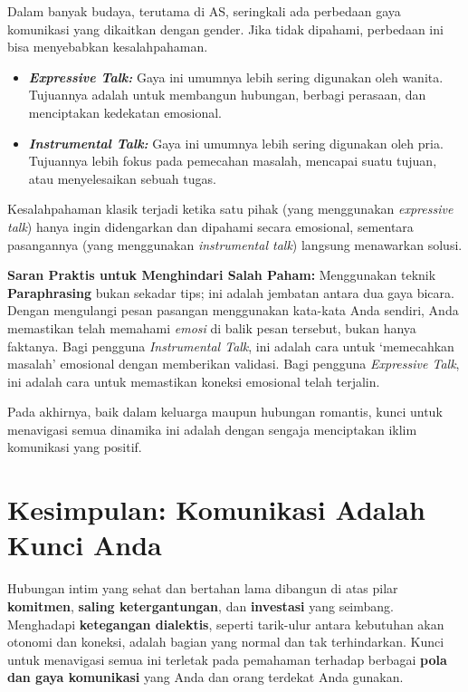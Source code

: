 \documentclass[
  letterpaper,
  DIV=11,
  numbers=noendperiod]{scrreprt}
\providecommand{\tightlist}{%
  \setlength{\itemsep}{0pt}\setlength{\parskip}{0pt}}
\begin{document}
Dalam banyak budaya, terutama di AS, seringkali ada perbedaan gaya
komunikasi yang dikaitkan dengan gender. Jika tidak dipahami, perbedaan
ini bisa menyebabkan kesalahpahaman.

\begin{itemize}
\tightlist
\item
  \emph{\textbf{Expressive Talk:}} Gaya ini umumnya lebih sering
  digunakan oleh wanita. Tujuannya adalah untuk membangun hubungan,
  berbagi perasaan, dan menciptakan kedekatan emosional.
\item
  \emph{\textbf{Instrumental Talk:}} Gaya ini umumnya lebih sering
  digunakan oleh pria. Tujuannya lebih fokus pada pemecahan masalah,
  mencapai suatu tujuan, atau menyelesaikan sebuah tugas.
\end{itemize}

Kesalahpahaman klasik terjadi ketika satu pihak (yang menggunakan
\emph{expressive talk}) hanya ingin didengarkan dan dipahami secara
emosional, sementara pasangannya (yang menggunakan \emph{instrumental
talk}) langsung menawarkan solusi.

\textbf{Saran Praktis untuk Menghindari Salah Paham:} Menggunakan teknik
\textbf{Paraphrasing} bukan sekadar tips; ini adalah jembatan antara dua
gaya bicara. Dengan mengulangi pesan pasangan menggunakan kata-kata Anda
sendiri, Anda memastikan telah memahami \emph{emosi} di balik pesan
tersebut, bukan hanya faktanya. Bagi pengguna \emph{Instrumental Talk},
ini adalah cara untuk `memecahkan masalah' emosional dengan memberikan
validasi. Bagi pengguna \emph{Expressive Talk}, ini adalah cara untuk
memastikan koneksi emosional telah terjalin.

Pada akhirnya, baik dalam keluarga maupun hubungan romantis, kunci untuk
menavigasi semua dinamika ini adalah dengan sengaja menciptakan iklim
komunikasi yang positif.

\section{Kesimpulan: Komunikasi Adalah Kunci
Anda}\label{kesimpulan-komunikasi-adalah-kunci-anda}

Hubungan intim yang sehat dan bertahan lama dibangun di atas pilar
\textbf{komitmen}, \textbf{saling ketergantungan}, dan
\textbf{investasi} yang seimbang. Menghadapi \textbf{ketegangan
dialektis}, seperti tarik-ulur antara kebutuhan akan otonomi dan
koneksi, adalah bagian yang normal dan tak terhindarkan. Kunci untuk
menavigasi semua ini terletak pada pemahaman terhadap berbagai
\textbf{pola dan gaya komunikasi} yang Anda dan orang terdekat Anda
gunakan.
\end{document}
